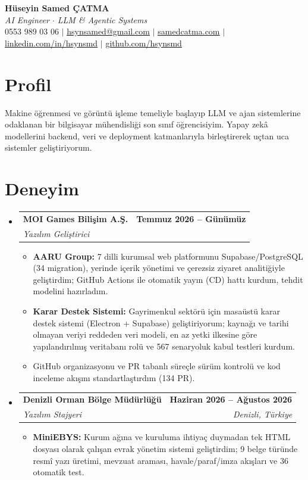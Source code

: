 \documentclass[letterpaper,11pt]{article}
\makeatletter
\newcommand{\resumeItem}[1]{
  \item\small{
    {#1 \vspace{-2pt}}
  }
}
\newcommand{\resumeSubheading}[4]{
  \vspace{-2pt}\item
    \begin{tabular*}{1.0\textwidth}[t]{l@{\extracolsep{\fill}}r}
      \textbf{#1} & \textbf{\small #2} \\
      \textit{\small#3} & \textit{\small #4} \\
    \end{tabular*}\vspace{-7pt}
}
\newcommand{\resumeSubHeadingListStart}{\begin{itemize}[leftmargin=0.0in, label={}]}
\newcommand{\resumeSubHeadingListEnd}{\end{itemize}}
\newcommand{\resumeItemListStart}{\begin{itemize}}
\newcommand{\resumeItemListEnd}{\end{itemize}\vspace{-5pt}}
\makeatother
\begin{document}
\begin{center}
    \textbf{\Huge Hüseyin Samed ÇATMA} \\ \vspace{2pt}
    \small \textit{AI Engineer $\cdot$ LLM \& Agentic Systems} \\ \vspace{2pt}
    \small 0553 989 03 06 $|$ \href{mailto:hsynsamed@gmail.com}{\underline{hsynsamed@gmail.com}} $|$
    \href{https://samedcatma.com}{\underline{samedcatma.com}} $|$
    \href{https://linkedin.com/in/hsynsmd}{\underline{linkedin.com/in/hsynsmd}} $|$
    \href{https://github.com/hsynsmd}{\underline{github.com/hsynsmd}}
\end{center}

\section{Profil}
\small{
Makine öğrenmesi ve görüntü işleme temeliyle başlayıp LLM ve ajan sistemlerine odaklanan bir bilgisayar mühendisliği son sınıf öğrencisiyim. Yapay zekâ modellerini backend, veri ve deployment katmanlarıyla birleştirerek uçtan uca sistemler geliştiriyorum.
}
\vspace{2pt}

\section{Deneyim}
  \resumeSubHeadingListStart
    \resumeSubheading
      {MOI Games Bilişim A.Ş.}{Temmuz 2026 -- Günümüz}
      {Yazılım Geliştirici}{}
      \resumeItemListStart
        \resumeItem{\textbf{AARU Group:} 7 dilli kurumsal web platformunu Supabase/PostgreSQL (34 migration), yerinde içerik yönetimi ve çerezsiz ziyaret analitiğiyle geliştirdim; GitHub Actions ile otomatik yayın (CD) hattı kurdum, tehdit modelini hazırladım.}
        \resumeItem{\textbf{Karar Destek Sistemi:} Gayrimenkul sektörü için masaüstü karar destek sistemi (Electron + Supabase) geliştiriyorum; kaynağı ve tarihi olmayan veriyi reddeden veri modeli, en az yetki ilkesine göre yapılandırılmış veritabanı rolü ve 567 senaryoluk kabul testleri kurdum.}
        \resumeItem{GitHub organizasyonu ve PR tabanlı süreçle sürüm kontrolü ve kod inceleme akışını standartlaştırdım (134 PR).}
      \resumeItemListEnd
    \resumeSubheading
      {Denizli Orman Bölge Müdürlüğü}{Haziran 2026 -- Ağustos 2026}
      {Yazılım Stajyeri}{Denizli, Türkiye}
      \resumeItemListStart
        \resumeItem{\textbf{MiniEBYS:} Kurum ağına ve kuruluma ihtiyaç duymadan tek HTML dosyası olarak çalışan evrak yönetim sistemi geliştirdim; 9 belge türünde resmî yazı üretimi, mevzuat araması, havale/paraf/imza akışları ve 36 otomatik test.}      \resumeItemListEnd
  \resumeSubHeadingListEnd
\end{document}
